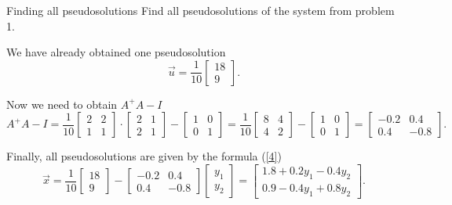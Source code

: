     \begin{problem}{Finding all pseudosolutions}  
        Find all pseudosolutions of the system from problem 1.
        \begin{solution}
            We have already obtained one pseudosolution
            \[
                \vec{u} = \dfrac{1}{10}\begin{bmatrix}
                    18\\
                    9
                \end{bmatrix}.  
            \]
            
            Now we need to obtain $A^+A-I$
            \[
                A^+A-I = \dfrac{1}{10} \begin{bmatrix}
                    2 & 2 \\
                    1 & 1
                \end{bmatrix} \cdot \begin{bmatrix}
                    2 & 1\\
                    2 & 1
                \end{bmatrix} - \begin{bmatrix}
                    1 & 0\\
                    0 & 1
                \end{bmatrix} = \dfrac{1}{10}\begin{bmatrix}
                    8 & 4 \\
                    4 & 2
                \end{bmatrix} - \begin{bmatrix}
                    1 & 0 \\
                    0 & 1
                \end{bmatrix} = \begin{bmatrix}
                    -0.2 & 0.4 \\
                    0.4 & -0.8
                \end{bmatrix}.
            \]
            
            Finally, all pseudosolutions are given by the formula (\ref{4})
            \[
                \vec{x} = \dfrac{1}{10}\begin{bmatrix}
                    18 \\ 9
                \end{bmatrix} - \begin{bmatrix}
                    -0.2 & 0.4\\
                    0.4 & -0.8
                \end{bmatrix}  \begin{bmatrix}
                    y_1 \\
                    y_2
                \end{bmatrix} = \begin{bmatrix}
                    1.8 + 0.2y_1 - 0.4 y_2\\
                    0.9 - 0.4y_1 + 0.8y_2
                \end{bmatrix}.
            \] 
        \end{solution}
    \end{problem}
    \newpage
